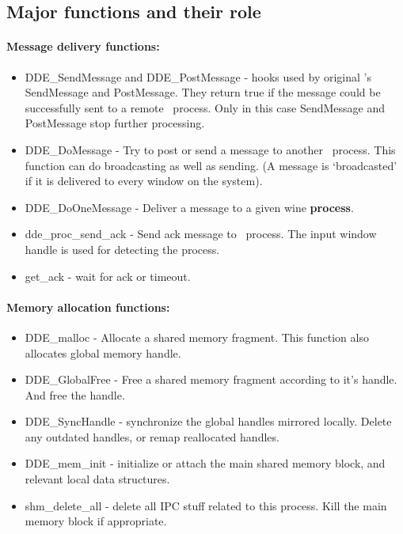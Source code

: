 \subsection{Major functions and their role}
\paragraph{Message delivery functions:}
\begin{itemize}
  \item DDE\_SendMessage and DDE\_PostMessage - hooks used by original
    \Wine's SendMessage and PostMessage. They return true if the
    message could be successfully sent to a remote \Wine\ process.
    Only in this case SendMessage and PostMessage stop further
    processing.
  \item DDE\_DoMessage - Try to post or send a message to another
    \Wine\ process. This function can do broadcasting as well as
    sending. (A message is `broadcasted' if it is delivered to every
    window on the system).
  \item DDE\_DoOneMessage - Deliver a message to a given wine
    {\bf process}.
  \item dde\_proc\_send\_ack - Send ack message to \Wine\
    process. The input window handle is used for detecting the
    process.
  \item get\_ack - wait for ack or timeout.
\end{itemize}

\paragraph{Memory allocation functions:}
\begin{itemize}
  \item DDE\_malloc - Allocate a shared memory fragment. This function
    also allocates global memory handle.
  \item DDE\_GlobalFree - Free a shared memory fragment according to
    it's handle. And free the handle.
  \item DDE\_SyncHandle - synchronize the global handles mirrored
    locally. Delete any outdated handles, or remap reallocated
    handles. 
  \item DDE\_mem\_init - initialize or attach the main shared memory
    block, and relevant local data structures.
  \item shm\_delete\_all - delete all IPC stuff related to this
    process. Kill the main memory block if appropriate.
\end{itemize}


